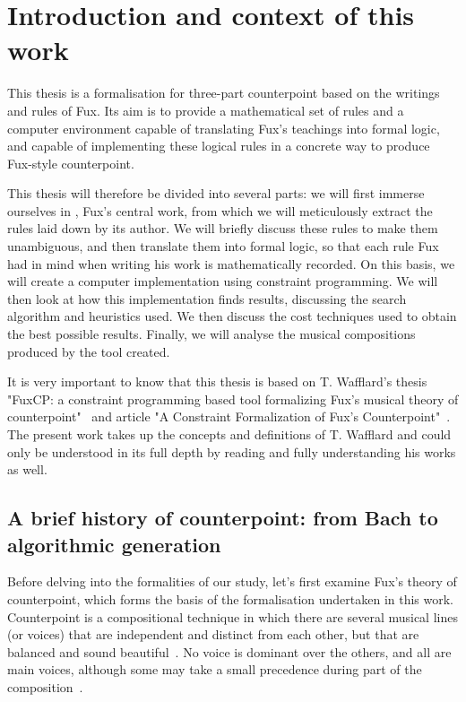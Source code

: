 \chapter{Introduction and context of this work}
This thesis is a formalisation for three-part counterpoint based on the writings and rules of Fux. Its aim is to provide a mathematical set of rules and a computer environment capable of translating Fux's teachings into formal logic, and capable of implementing these logical rules in a concrete way to produce Fux-style counterpoint.


This thesis will therefore be divided into several parts: we will first immerse ourselves in \gap, Fux's central work, from which we will meticulously extract the rules laid down by its author. We will briefly discuss these rules to make them unambiguous, and then translate them into formal logic, so that each rule Fux had in mind when writing his work is mathematically recorded. On this basis, we will create a computer implementation using constraint programming. We will then look at how this implementation finds results, discussing the search algorithm and heuristics used. We then discuss the cost techniques used to obtain the best possible results. Finally, we will analyse the musical compositions produced by the tool created.

It is very important to know that this thesis is based on T. Wafflard's thesis "FuxCP: a constraint programming based tool formalizing Fux's musical theory of counterpoint"~\cite{wafflard2023} and article "A Constraint Formalization of Fux's Counterpoint"~\cite{sprockeels2023constraint}. The present work takes up the concepts and definitions of T. Wafflard and could only be understood in its full depth by reading and fully understanding his works as well. %



\section{A brief history of counterpoint: from Bach to algorithmic generation}
Before delving into the formalities of our study, let's first examine Fux's theory of counterpoint, which forms the basis of the formalisation undertaken in this work. Counterpoint is a compositional technique in which there are several musical lines (or voices) that are independent and distinct from each other, but that are balanced and sound beautiful~\cite{CpSachs}. No voice is dominant over the others, and all are main voices, although some may take a small precedence during part of the composition~\cite{hess2016}.


